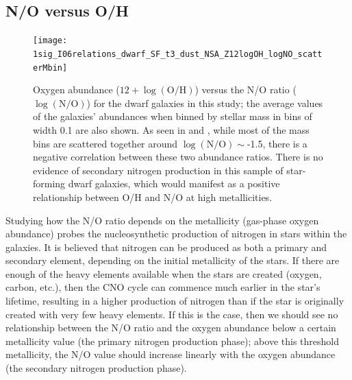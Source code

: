 \subsection{N/O versus O/H} \label{sec:NO_OH}

\begin{figure}
    \centering
    \texttt{[image: 1sig\_I06relations\_dwarf\_SF\_t3\_dust\_NSA\_Z12logOH\_logNO\_scatterMbin]}
    \caption{Oxygen abundance ($12 + \log \left(\text{O}/\text{H}\right)$) 
    versus the N/O ratio ($\log \left( \text{N}/\text{O}\right)$) for the dwarf 
    galaxies in this study; the average values of the galaxies' abundances when 
    binned by stellar mass in bins of width 0.1 are also shown.  As seen in 
    \cite{Andrews13} and \cite{Douglass17b}, while most of the mass bins are 
    scattered together around $\log (\text{N}/\text{O}) \sim$-1.5, there is a 
    negative correlation between these two abundance ratios.  There is no 
    evidence of secondary nitrogen production in this sample of star-forming 
    dwarf galaxies, which would manifest as a positive relationship between 
    O/H and N/O at high metallicities.}
    \label{fig:NOvOH}
\end{figure}

Studying how the N/O ratio depends on the metallicity (gas-phase oxygen 
abundance) probes the nucleosynthetic production of nitrogen in stars within the 
galaxies.  It is believed that nitrogen can be produced as both a primary and 
secondary element, depending on the initial metallicity of the stars.  If there 
are enough of the heavy elements available when the stars are created (oxygen, 
carbon, etc.), then the CNO cycle can commence much earlier in the star's 
lifetime, resulting in a higher production of nitrogen than if the star is 
originally created with very few heavy elements.  If this is the case, then we 
should see no relationship between the N/O ratio and the oxygen abundance below 
a certain metallicity value (the primary nitrogen production phase); above this 
threshold metallicity, the N/O value should increase linearly with the oxygen 
abundance (the secondary nitrogen production phase).

